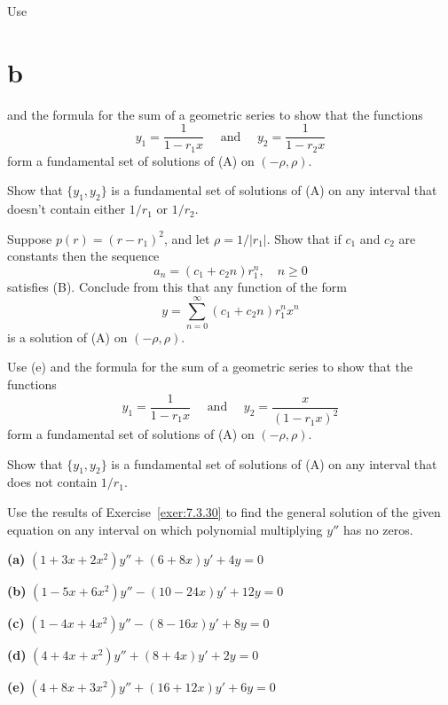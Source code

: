 \begin{exerciselist}
\begin{alist}
    \item %
    Use \part{b} and the formula for the sum of a geometric series to show that the functions
    \[
      y_{1}=\frac{1}{1-r_{1}x}\quad\mbox{ and }\quad y_{2}=\frac{1}{1-r_{2}x}
    \]
    form a fundamental set of solutions of (A) on $(-\rho,\rho)$.

    \item %
    Show that $\{y_{1},y_{2}\}$ is a fundamental set of solutions of (A) on any interval that
    doesn't contain either $1/r_{1}$ or $1/r_{2}$.

    \item %
    Suppose $p(r)=(r-r_{1})^{2}$, and let $\rho=1/|r_{1}|$. Show that if $c_{1}$ and $c_{2}$ are
    constants then the sequence
    \[
      a_{n}=(c_{1}+c_{2}n)r_{1}^{n},\quad n\ge0
    \]
    satisfies (B). Conclude from this that any function of the form
    \[
      y=\sum_{n=0}^{\infty}(c_{1}+c_{2}n)r_{1}^{n}x^{n}
    \]
    is a solution of (A) on $(-\rho,\rho)$.

    \item %
    Use (e) and the formula for the sum of a geometric series to show that the functions
    \[
      y_{1}=\frac{1}{1-r_{1}x}\quad\mbox{ and }\quad y_{2}=\frac{x}{(1-r_{1}x)^{2}}
    \]
    form a fundamental set of solutions of (A) on $(-\rho,\rho)$.

    \item %
    Show that $\{y_{1},y_{2}\}$ is a fundamental set of solutions of (A) on any interval that does
    not contain $1/r_{1}$.
  \end{alist}

  \item\label{exer:7.3.31} Use the results of Exercise~\ref{exer:7.3.30} to find the general
        solution of the given equation on any interval on which polynomial multiplying $y''$ has no
        zeros.

  {\bf (a)} $(1+3x+2x^{2})y''+(6+8x)y'+4y=0$

  {\bf (b)} $(1-5x+6x^{2})y''-(10-24x)y'+12y=0$

  {\bf (c)} $(1-4x+4x^{2})y''-(8-16x)y'+8y=0$

  {\bf (d)} $(4+4x+x^{2})y''+(8+4x)y'+2y=0$

  {\bf (e)} $(4+8x+3x^{2})y''+(16+12x)y'+6y=0$



\end{exerciselist}
